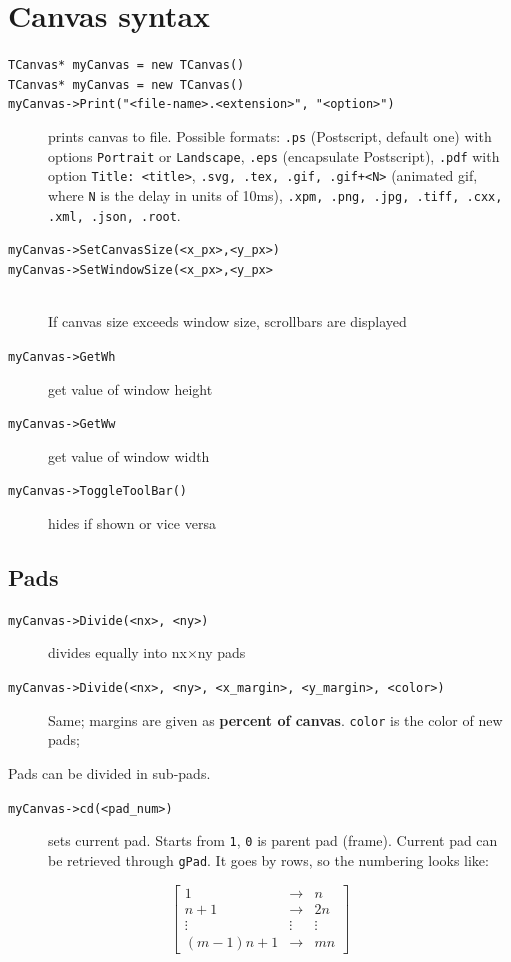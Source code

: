 \documentclass[10pt, oneside]{article}
\begin{document}
\section{Canvas syntax}
\begin{description}
\item[\texttt{TCanvas* myCanvas = new TCanvas()}]
\item[\texttt{TCanvas* myCanvas = new TCanvas()}]
\item[\texttt{myCanvas->Print("<file-name>.<extension>", "<option>")}] prints canvas to file. Possible formats: \texttt{.ps} (Postscript, default one) with options \texttt{Portrait} or \texttt{Landscape}, \texttt{.eps} (encapsulate Postscript), \texttt{.pdf} with option \texttt{Title: <title>}, \texttt{.svg, .tex, .gif, .gif+<N>} (animated gif, where \texttt{N} is the delay in units of 10ms), \texttt{.xpm, .png, .jpg, .tiff, .cxx, .xml, .json, .root}.
\item[\texttt{myCanvas->SetCanvasSize(<x\_px>,<y\_px>)}]
\item[\texttt{myCanvas->SetWindowSize(<x\_px>,<y\_px>}]{}\,\\
If canvas size exceeds window size, scrollbars are displayed
\item[\texttt{myCanvas->GetWh}] get value of window height
\item[\texttt{myCanvas->GetWw}] get value of window width
\item[\texttt{myCanvas->ToggleToolBar()}] hides if shown or vice versa
\end{description}
\subsection*{Pads}
\begin{description}
\item[\texttt{myCanvas->Divide(<nx>, <ny>)}] divides equally into nx$\times$ny pads 
\item[\texttt{myCanvas->Divide(<nx>, <ny>, <x\_margin>, <y\_margin>, <color>)}] Same; margins are given as \textbf{percent of canvas}. \texttt{color} is the color of new pads; 
\end{description}
Pads can be divided in sub-pads.
\begin{description}
\item[\texttt{myCanvas->cd(<pad\_num>)}] sets current pad. Starts from \texttt{1}, \texttt{0} is parent pad (frame). Current pad can be retrieved through \texttt{gPad}. It goes by rows, so the numbering looks like:
\end{description}
\[\begin{bmatrix}
1 & \rightarrow &  n \\
n+1 & \rightarrow & 2n \\
\vdots & \vdots & \vdots\\
(m-1)n + 1 & \rightarrow & mn
\end{bmatrix}\]
\end{document}
